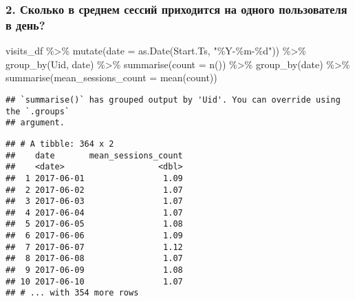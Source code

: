 \documentclass[
]{article}
\newenvironment{Shaded}{\begin{snugshade}}{\end{snugshade}}
\newcommand{\AttributeTok}[1]{\textcolor[rgb]{0.77,0.63,0.00}{#1}}
\newcommand{\FunctionTok}[1]{\textcolor[rgb]{0.00,0.00,0.00}{#1}}
\newcommand{\NormalTok}[1]{#1}
\newcommand{\SpecialCharTok}[1]{\textcolor[rgb]{0.00,0.00,0.00}{#1}}
\newcommand{\StringTok}[1]{\textcolor[rgb]{0.31,0.60,0.02}{#1}}
\begin{document}
\hypertarget{ux441ux43aux43eux43bux44cux43aux43e-ux432-ux441ux440ux435ux434ux43dux435ux43c-ux441ux435ux441ux441ux438ux439-ux43fux440ux438ux445ux43eux434ux438ux442ux441ux44f-ux43dux430-ux43eux434ux43dux43eux433ux43e-ux43fux43eux43bux44cux437ux43eux432ux430ux442ux435ux43bux44f-ux432-ux434ux435ux43dux44c}{%
\subsubsection{2. Сколько в среднем сессий приходится на одного
пользователя в
день?}\label{ux441ux43aux43eux43bux44cux43aux43e-ux432-ux441ux440ux435ux434ux43dux435ux43c-ux441ux435ux441ux441ux438ux439-ux43fux440ux438ux445ux43eux434ux438ux442ux441ux44f-ux43dux430-ux43eux434ux43dux43eux433ux43e-ux43fux43eux43bux44cux437ux43eux432ux430ux442ux435ux43bux44f-ux432-ux434ux435ux43dux44c}}

\begin{Shaded}
\begin{Highlighting}[]
\NormalTok{visits\_df }\SpecialCharTok{\%\textgreater{}\%}
  \FunctionTok{mutate}\NormalTok{(}\AttributeTok{date =} \FunctionTok{as.Date}\NormalTok{(Start.Ts, }\StringTok{"\%Y{-}\%m{-}\%d"}\NormalTok{)) }\SpecialCharTok{\%\textgreater{}\%} 
  \FunctionTok{group\_by}\NormalTok{(Uid, date) }\SpecialCharTok{\%\textgreater{}\%} 
  \FunctionTok{summarise}\NormalTok{(}\AttributeTok{count =} \FunctionTok{n}\NormalTok{()) }\SpecialCharTok{\%\textgreater{}\%} 
  \FunctionTok{group\_by}\NormalTok{(date) }\SpecialCharTok{\%\textgreater{}\%} 
  \FunctionTok{summarise}\NormalTok{(}\AttributeTok{mean\_sessions\_count =} \FunctionTok{mean}\NormalTok{(count))}
\end{Highlighting}
\end{Shaded}

\begin{verbatim}
## `summarise()` has grouped output by 'Uid'. You can override using the `.groups`
## argument.
\end{verbatim}

\begin{verbatim}
## # A tibble: 364 x 2
##    date       mean_sessions_count
##    <date>                   <dbl>
##  1 2017-06-01                1.09
##  2 2017-06-02                1.07
##  3 2017-06-03                1.07
##  4 2017-06-04                1.07
##  5 2017-06-05                1.08
##  6 2017-06-06                1.09
##  7 2017-06-07                1.12
##  8 2017-06-08                1.07
##  9 2017-06-09                1.08
## 10 2017-06-10                1.07
## # ... with 354 more rows
\end{verbatim}
\end{document}

